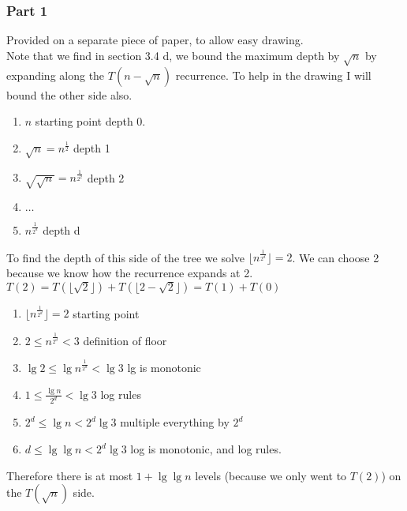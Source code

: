 \documentclass{article}
\begin{document}
      \subsubsection{Part 1}
        Provided on a separate piece of paper, to allow easy drawing.\\
        Note that we find in section 3.4 d, we bound the maximum depth by $\sqrt{n}$ by expanding along the $T(n - \sqrt{n})$ recurrence. To help in the drawing I will bound the other side also. \\
        \begin{enumerate}
          \item $n$ \hfill starting point depth 0.
          \item $\sqrt{n} = n^{\frac{1}{2}}$ \hfill depth 1
          \item $\sqrt{\sqrt{n}} = n^{\frac{1}{2^{2}}}$ \hfill depth 2
          \item $\ldots$ \hfill
          \item $n^{\frac{1}{2^{d}}}$ \hfill depth d
        \end{enumerate}
        To find the depth of this side of the tree we solve $\lfloor n^{\frac{1}{2^{d}}} \rfloor = 2$. We can choose 2 because we know how the recurrence expands at 2. $T(2) = T(\lfloor \sqrt{2}\rfloor) + T(\lfloor 2 - \sqrt{2} \rfloor) = T(1) + T(0)$\\
        \begin{enumerate}
          \item $\lfloor n^{\frac{1}{2^{d}}} \rfloor = 2$ \hfill starting point
          \item $2 \leq n^{\frac{1}{2^{d}}} < 3$ \hfill definition of floor
          \item $\lg{2} \leq \lg{n^{\frac{1}{2^{d}}}} < \lg{3}$ \hfill lg is monotonic
          \item $1 \leq \frac{\lg{n}}{2^{d}} < \lg{3}$ \hfill log rules
          \item $2^{d} \leq \lg{n} < 2^{d}\lg{3}$ \hfill multiple everything by $2^{d}$
          \item $d \leq \lg{\lg{n}} < 2^{d}\lg{3}$ \hfill log is monotonic, and log rules.
        \end{enumerate}
        Therefore there is at most $1 + \lg{\lg{n}}$ levels (because we only went to $T(2)$) on the $T(\sqrt{n})$ side.
\end{document}
